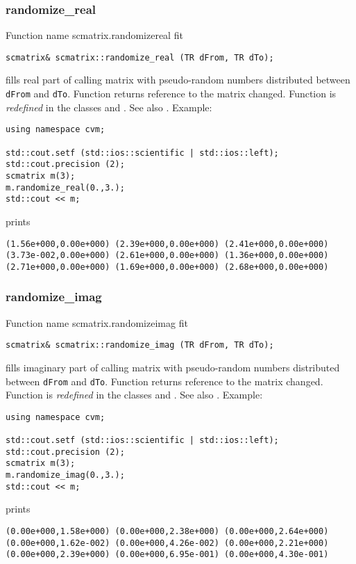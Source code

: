 \subsubsection{randomize\_real}
Function%
\pdfdest name {scmatrix.randomizereal} fit
\begin{verbatim}
scmatrix& scmatrix::randomize_real (TR dFrom, TR dTo);
\end{verbatim}
fills  real part of  calling matrix with 
pseudo-random numbers distributed between
\verb"dFrom" and \verb"dTo".
Function
returns  reference to the matrix changed.
Function is \emph{redefined} in the classes
 and
.
See also
.
Example:
\begin{Verbatim}
using namespace cvm;

std::cout.setf (std::ios::scientific | std::ios::left); 
std::cout.precision (2);
scmatrix m(3);
m.randomize_real(0.,3.);
std::cout << m;
\end{Verbatim}
prints
\begin{Verbatim}
(1.56e+000,0.00e+000) (2.39e+000,0.00e+000) (2.41e+000,0.00e+000)
(3.73e-002,0.00e+000) (2.61e+000,0.00e+000) (1.36e+000,0.00e+000)
(2.71e+000,0.00e+000) (1.69e+000,0.00e+000) (2.68e+000,0.00e+000)
\end{Verbatim}
\newpage


\subsubsection{randomize\_imag}
Function%
\pdfdest name {scmatrix.randomizeimag} fit
\begin{verbatim}
scmatrix& scmatrix::randomize_imag (TR dFrom, TR dTo);
\end{verbatim}
fills  imaginary part of  calling matrix with 
pseudo-random numbers distributed between
\verb"dFrom" and \verb"dTo".
Function
returns  reference to the matrix changed.
Function is \emph{redefined} in the classes
 and
.
See also
.
Example:
\begin{Verbatim}
using namespace cvm;

std::cout.setf (std::ios::scientific | std::ios::left); 
std::cout.precision (2);
scmatrix m(3);
m.randomize_imag(0.,3.);
std::cout << m;
\end{Verbatim}
prints
\begin{Verbatim}
(0.00e+000,1.58e+000) (0.00e+000,2.38e+000) (0.00e+000,2.64e+000)
(0.00e+000,1.62e-002) (0.00e+000,4.26e-002) (0.00e+000,2.21e+000)
(0.00e+000,2.39e+000) (0.00e+000,6.95e-001) (0.00e+000,4.30e-001)
\end{Verbatim}
\newpage

